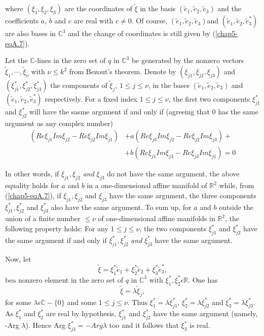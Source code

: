 where $(\xi_{1}, \xi_{2}, \xi_{3})$ are the coordinates of $\widetilde{\xi}$ in the basis $(\widetilde{e}_{1}, \widetilde{e}_{2}, \widetilde{e}_{3})$ and the coefficients $a$, $b$ and $c$ are real with $c \neq 0$. Of course, $(\widetilde{e}_{1}, \widetilde{e}_{2}, \widetilde{e}_{3})$\pageoriginale and $(\widetilde{e}_{1}, \widetilde{e}_{2}, \widetilde{e}_{3}^{*})$ are also bases in $\mathbb{C}^{3}$ and the change of coordinates is still given by (\ref{chap5-eqA.7}).

Let the $\mathbb{C}$-lines in the zero set of $q$ in $\mathbb{C}^{3}$ be generated by the nonzero vectors $\widetilde{\xi}_{1}, \cdots, \widetilde{\xi}_{\nu}$ with $\nu \leq k^{2}$ from Bezout's theorem. Denote by $(\xi_{j1}, \xi_{j2}, \xi_{j3})$ and $(\xi_{j1}^{*}, \xi_{j2}^{*}, \xi_{j3}^{*})$ the components of $\widetilde{\xi}_{j}$, $1 \leq j \leq \nu$, in the bases $(\widetilde{e}_{1}, \widetilde{e}_{2}, \widetilde{e}_{3})$ and $(\widetilde{e}_{1}, \widetilde{e}_{2}, \widetilde{e}_{3}^{*})$ respectively. For a fixed index $1 \leq j \leq \nu$, the first two components $\xi_{j1}^{*}$ and $\xi_{j2}^{*}$ will have the sasme argument if and only if (agreeing that 0 has  the same argument as any complex number)
\begin{align*}
(Re \xi_{j1} Im \xi_{j2} - Re \xi_{j2} Im \xi_{j1}) & + a(Re \xi_{j3} Im \xi_{j2} - Re \xi_{j2} Im \xi_{j3}) + \\
& + b(Re \xi_{j1} Im \xi_{j3} - Re \xi_{j3} Im \xi_{j1}) = 0
\end{align*}

In other words, if $\xi_{j1}, \xi_{j2}$ {\em and} $\xi_{j3}$ do not have the same argument, the above equality holds for $a$ and $b$ in a one-dimensional affine manifold of $\mathbb{R}^{2}$ while, from (\ref{chap5-eqA.7}), if $\xi_{j1}, \xi_{j2}$ and $\xi_{j3}$ have the same argument, the three components $\xi_{j1}^{*}, \xi_{j2}^{*}$ and $\xi_{j3}^{*}$ also have the same argument. To sum up, for $a$ and $b$ outside the union of a finite number $\leq \nu$ of one-dimensional affine manifolds in $\mathbb{R}^{2}$, the following property holds: For any $1 \leq j \leq \nu$, the two components $\xi_{j1}^{*}$ and $\xi_{j2}^{*}$ have the same argument if and only if $\xi_{j1}^{*}, \xi_{j2}^{*}$ {\em and} $\xi_{j3}^{*}$ have the same argument.

Now, let
$$
\widetilde{\xi} = \xi_{1}^{*} \widetilde{e}_{1} + \xi_{2}^{*} \widetilde{e}_{2} + \xi_{3}^{*} \widetilde{e}_{3}^{*},
$$
be\pageoriginale a nonzero element in the zero set of $q$ in $\mathbb{C}^{3}$ with $\xi_{1}^{*}, \xi_{2}^{*} \epsilon \mathbb{R}$. One has
$$
\widetilde{\xi} = \lambda \widetilde{\xi}_{j},
$$ 
for some $\lambda \epsilon \mathbb{C} - \{0\}$ and some $1 \leq j \leq \nu$. Thus $\xi_{1}^{*} = \lambda \xi_{j1}^{*}$, $\xi_{2}^{*} = \lambda \xi_{j2}^{*}$ and $\xi_{3}^{*} = \lambda \xi_{j3}^{*}$. As $\xi_{1}^{*}$ and $\xi_{2}^{*}$ are real by hypothesis, $\xi_{j1}^{*}$ and $\xi_{j2}^{*}$ have the same argument (namely, -Arg $\lambda$). Hence Arg $\xi_{j3}^{*} = -Arg \lambda$ too and it follows that $\xi_{3}^{*}$ is real.

